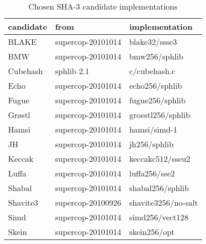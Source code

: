 \begin{table}
  \centering
  \caption{Chosen SHA-3 candidate implementations}
  \begin{tabular}{ | l | l | l | }
    \hline
    \textbf{candidate} & \textbf{from} & \textbf{implementation} \\ \hline
     BLAKE      & supercop-20101014 & blake32/ssse3     \\ \hline
     \ac{BMW}   & supercop-20101014 & bmw256/sphlib     \\ \hline
     Cubehash   & sphlib 2.1        & c/cubehash.c      \\ \hline
     Echo       & supercop-20101014 & echo256/sphlib    \\ \hline
     Fugue      & supercop-20101014 & fugue256/sphlib   \\ \hline
     Grøstl     & supercop-20101014 & groestl256/sphlib \\ \hline
     Hamsi      & supercop-20101014 & hamsi/simd-1      \\ \hline
     JH         & supercop-20101014 & jh256/sphlib      \\ \hline
     Keccak     & supercop-20101014 & keccakc512/sseu2  \\ \hline
     Luffa      & supercop-20101014 & luffa256/sse2     \\ \hline
     Shabal     & supercop-20101014 & shabal256/sphlib  \\ \hline
     Shavite3   & supercop-20100926 & shavite3256/no-salt       \\ \hline
     Simd       & supercop-20101014 & simd256/vect128   \\ \hline
     Skein      & supercop-20101014 & skein256/opt      \\ \hline
  \end{tabular}
  \label{tbl:sha3:implementations}
\end{table}
